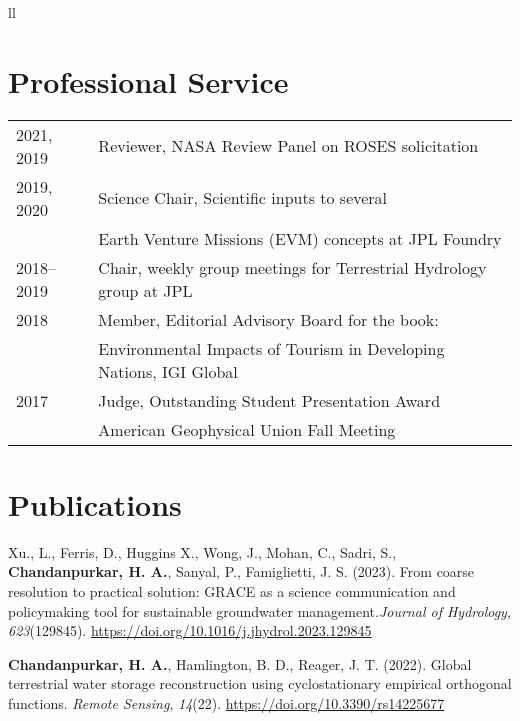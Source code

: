 ll\documentclass[10pt]{article}
\begin{document}
\section*{Professional Service}
\hline
\label{professional-service}
\begin{tabular}{ l l }
2021, 2019& Reviewer, NASA Review Panel on ROSES solicitation \\
2019, 2020& Science Chair, Scientific inputs to several \\
{} & Earth Venture Missions (EVM) concepts at JPL Foundry \\
2018--2019 & Chair, weekly group meetings for Terrestrial Hydrology group at JPL \\
2018 & Member, Editorial Advisory Board for the book:\\ 
{} & Environmental Impacts of Tourism in Developing Nations, IGI Global \\
2017 & Judge, Outstanding Student Presentation Award \\
{} & American Geophysical Union Fall Meeting \\
\end{tabular}

\FloatBarrier
\section*{Publications}\sloppy
\hline







\label{csl:0} Xu., L., Ferris, D., Huggins X., Wong, J., Mohan, C., Sadri, S., \textbf{Chandanpurkar, H. A.}, Sanyal, P., Famiglietti, J. S. (2023). {From
coarse resolution to practical solution: GRACE as a science communication and policymaking tool for sustainable
groundwater management}.\textit{Journal of Hydrology}, \textit{623}(129845). \url{https://doi.org/10.1016/j.jhydrol.2023.129845}



\label{csl:0}\textbf{Chandanpurkar, H. A.}, Hamlington, B. D., Reager, J. T. (2022). {Global terrestrial water storage reconstruction using cyclostationary empirical orthogonal functions}. \textit{Remote Sensing}, \textit{14}(22). \url{https://doi.org/10.3390/rs14225677}
\end{document}
